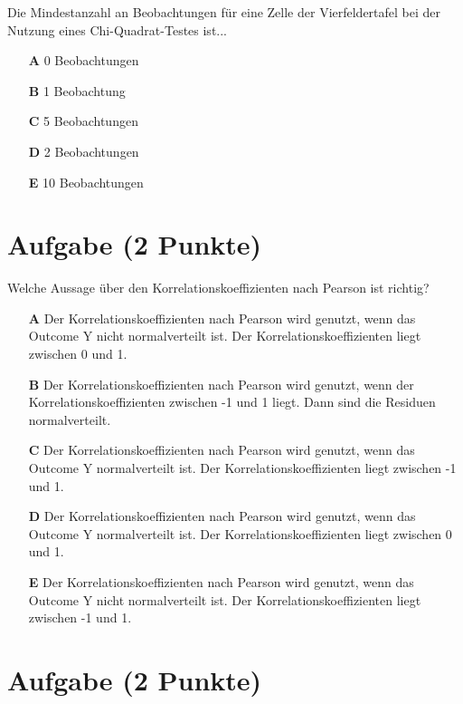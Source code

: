 \documentclass[a4paper, 10pt]{scrartcl}\usepackage[]{graphicx}\usepackage[]{xcolor}
\begin{document}
Die Mindestanzahl an Beobachtungen f{\"u}r eine Zelle der Vierfeldertafel bei
der Nutzung eines Chi-Quadrat-Testes ist...



\begin{enumerate}
\item [\textbf{A} \msquare] 0 Beobachtungen
\item [\textbf{B} \msquare] 1 Beobachtung
\item [\textbf{C} \msquare] 5 Beobachtungen
\item [\textbf{D} \msquare] 2 Beobachtungen
\item [\textbf{E} \msquare] 10 Beobachtungen
\end{enumerate} 

\section{Aufgabe \hfill (2 Punkte)}




Welche Aussage {\"u}ber den Korrelationskoeffizienten nach Pearson
ist richtig?



\begin{enumerate}
\item [\textbf{A} \msquare] Der Korrelationskoeffizienten nach Pearson wird genutzt, wenn das Outcome Y nicht normalverteilt ist. Der Korrelationskoeffizienten liegt zwischen 0 und 1.
\item [\textbf{B} \msquare] Der Korrelationskoeffizienten nach Pearson wird genutzt, wenn der Korrelationskoeffizienten zwischen -1 und 1 liegt. Dann sind die Residuen normalverteilt.
\item [\textbf{C} \msquare] Der Korrelationskoeffizienten nach Pearson wird genutzt, wenn das Outcome Y normalverteilt ist. Der Korrelationskoeffizienten liegt zwischen -1 und 1.
\item [\textbf{D} \msquare] Der Korrelationskoeffizienten nach Pearson wird genutzt, wenn das Outcome Y normalverteilt ist. Der Korrelationskoeffizienten liegt zwischen 0 und 1.
\item [\textbf{E} \msquare] Der Korrelationskoeffizienten nach Pearson wird genutzt, wenn das Outcome Y nicht normalverteilt ist. Der Korrelationskoeffizienten liegt zwischen -1 und 1.
\end{enumerate} 

\section{Aufgabe \hfill (2 Punkte)}
\end{document}
